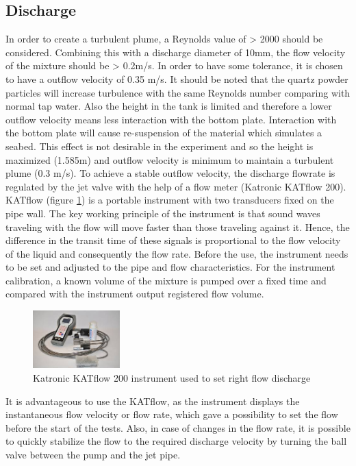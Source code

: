 \subsection{Discharge}
In order to create a turbulent plume, a Reynolds value of > 2000 should be considered. Combining this with a discharge diameter of 10mm, the flow velocity of the mixture should be > 0.2m/s. In order to have some tolerance, it is chosen to have a outflow velocity of 0.35 m/s. It should be noted that the quartz powder particles will increase turbulence with the same Reynolds number comparing with normal tap water. Also the height in the tank is limited and therefore a lower outflow velocity means less interaction with the bottom plate. Interaction with the bottom plate will cause re-suspension of the material which simulates a seabed. This effect is not desirable in the experiment and so the height is maximized (1.585m) and outflow velocity is minimum to maintain a turbulent plume (0.3 m/s). \newline
\noindent To achieve a stable outflow velocity, the discharge flowrate is regulated by the jet valve with the help of a flow meter (Katronic KATflow 200). KATflow (figure \ref{fig:Katronic}) is a portable instrument with two transducers fixed on the pipe wall. The key working principle of the instrument is that sound waves traveling with the flow will move faster than those traveling against it. Hence, the difference in the transit time of these signals is proportional to the flow velocity of the liquid and consequently the flow rate. Before the use, the instrument needs to be set and adjusted to the pipe and flow characteristics. For the instrument calibration, a known volume of the mixture is pumped over a fixed time and compared with the instrument output registered flow volume. 

\begin{figure}
    \centering
    \includegraphics[width=0.3\textwidth]{Images/Katronic.jpg}
    \caption{Katronic KATflow 200 instrument used to set right flow discharge}
    \label{fig:Katronic}
\end{figure}

\noindent It is advantageous to use the KATflow, as the instrument displays the instantaneous flow velocity or flow rate, which gave a possibility to set the flow before the start of the tests. Also, in case of changes in the flow rate, it is possible to quickly stabilize the flow to the required discharge velocity by turning the ball valve between the pump and the jet pipe.

